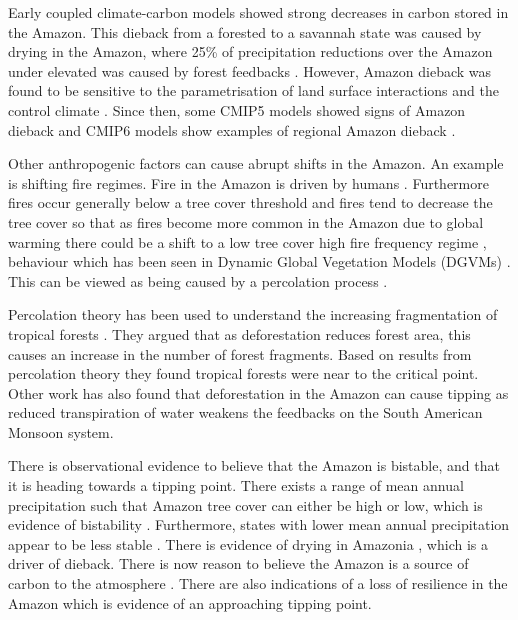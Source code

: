 Early coupled climate-carbon models \parencite{Cox2000} showed strong decreases in carbon stored in the Amazon. This dieback \parencite{Cox2004}  from a forested to a savannah state was
caused by drying in the Amazon, where 25\% of precipitation reductions over the Amazon under elevated  was caused by forest feedbacks \parencite{Betts2004}.
However, Amazon dieback was found to be sensitive to the parametrisation of land surface interactions and the control climate \parencite{Huntingford2004}. Since then,
some CMIP5 models \parencite{Drijfhout2015} showed signs of Amazon dieback and CMIP6 models show examples of regional Amazon dieback \parencite{Parry2022}.

Other anthropogenic factors can cause abrupt shifts in the Amazon. An example is shifting fire regimes. Fire in the Amazon is driven by humans \parencite{UNEP2002}.
Furthermore fires occur generally below a tree cover threshold \parencite{Wuyts2017} and fires tend to decrease the tree cover so that as fires become more common in the
Amazon due to global warming \parencite{Cochrane2009} there could be a shift to a low tree cover high fire frequency regime \parencite{Wuyts2022}, behaviour
which has been seen in Dynamic Global Vegetation Models (DGVMs) \parencite{Lasslop2016}. This can be viewed
as being caused by a percolation process \parencite{Schertzer2015,Cardoso2022}.

Percolation theory has been used to understand the increasing fragmentation of tropical forests \parencite{Taubert2018}. They argued that as deforestation reduces forest area,
this causes an increase in the number of forest fragments. Based on results from percolation theory \parencite{Stauffer1994} they found tropical forests were near to the critical point.
Other work \parencite{Boers2017} has also found that deforestation in the Amazon can cause tipping as reduced transpiration of water weakens the feedbacks on the South American Monsoon system. 

There is observational evidence to believe that the Amazon is bistable, and that it is heading towards a tipping point. There exists a range of mean annual precipitation
such that Amazon tree cover can either be high or low, which is evidence of bistability \parencite{Hirota2011,Staver2011}.  Furthermore, states with lower mean annual
precipitation appear to be less stable \parencite{Ciemer2019}. There is evidence of drying in Amazonia \parencite{Ritchie2022}, which is a driver of dieback. There is now reason to
believe the Amazon is a source of carbon to the atmosphere \parencite{Gatti2021}. There are also indications of a loss of resilience in the Amazon \parencite{Boulton2022} which is
evidence of an approaching tipping point.

